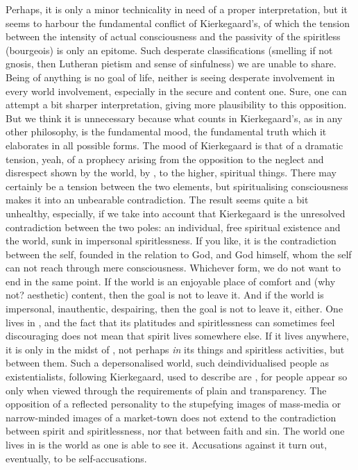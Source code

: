 Perhaps, it is only a minor technicality in need of a proper
interpretation, but it seems to harbour the fundamental conflict of
Kierkegaard's, of which the tension between the intensity of actual
consciousness and the passivity of the spiritless (bourgeois) is only an
epitome.   Such desperate classifications 
(smelling if not gnosis, then Lutheran pietism and sense of sinfulness)
we are unable to share. Being  of anything is no goal of life, neither is seeing desperate 
involvement in every world involvement, especially in the secure and content
one. Sure, one can attempt a bit sharper interpretation, giving more
plausibility to this opposition. But we think it is unnecessary because what
counts in Kierkegaard's, as in any other philosophy, is the fundamental mood,
the fundamental truth which it elaborates in all possible forms.  The mood of
Kierkegaard is that of a dramatic tension, yeah, of a prophecy arising from the
opposition to the neglect and disrespect shown by the world, by , to the higher, spiritual 
things.  There may certainly be a tension between the two
elements, but spiritualising consciousness makes it into an unbearable 
contradiction.  The result seems quite a bit unhealthy, especially, if we take
into account that  Kierkegaard is the unresolved
contradiction between the two poles: an individual, free spiritual existence and the
world, sunk in impersonal spiritlessness. If you like, it is the contradiction
between the self, founded in the relation to God, and God himself, whom the self
can not reach through mere consciousness. Whichever form, we do not want to end in the
same point. If the world is an enjoyable place of comfort and (why not?
aesthetic) content, then the goal is not to leave it. And if the world is
impersonal, inauthentic, despairing, then the goal is not to leave it, either.
One lives in , and the fact that its platitudes and
spiritlessness can sometimes feel discouraging does not mean that spirit lives
somewhere else. If it lives anywhere, it is only in the midst of , not perhaps {\em in} its  things and spiritless
activities, but between them. Such a depersonalised world, such deindividualised
people as 
existentialists, following Kierkegaard, used to describe are , for people appear so
only when viewed through the requirements of plain  and
transparency. The opposition of a reflected personality to the stupefying images
of mass-media or narrow-minded images of a market-town does not extend to the
contradiction between spirit and spiritlessness, nor that between
faith and sin. The world one lives in is the world as one is able to see
it. Accusations against it turn out, eventually, to be self-accusations. 

